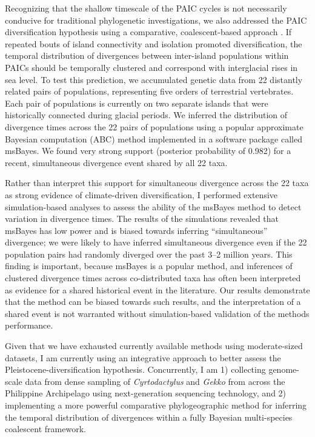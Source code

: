 \documentclass[10pt]{article}
\begin{document}
Recognizing that the shallow timescale of the PAIC cycles is not necessarily conducive for traditional phylogenetic investigations, we also addressed the PAIC diversification hypothesis using a comparative, coalescent-based approach \cite{Oaks2012}.
If repeated bouts of island connectivity and isolation promoted diversification, the temporal distribution of divergences between inter-island populations within PAICs should be temporally clustered and correspond with interglacial rises in sea level.
To test this prediction, we accumulated genetic data from 22 distantly related pairs of populations, representing five orders of terrestrial vertebrates.
Each pair of populations is currently on two separate islands that were historically connected during glacial periods.
We inferred the distribution of divergence times across the 22 pairs of populations using a popular approximate Bayesian computation (ABC) method implemented in a software package called msBayes.
We found very strong support (posterior probability of 0.982) for a recent, simultaneous divergence event shared by all 22 taxa.

Rather than interpret this support for simultaneous divergence across the 22 taxa as strong evidence of climate-driven diversification, I performed extensive simulation-based analyses to assess the ability of the msBayes method to detect variation in divergence times.
The results of the simulations revealed that msBayes has low power and is biased towards inferring ``simultaneous'' divergence; we were likely to have inferred simultaneous divergence even if the 22 population pairs had randomly diverged over the past 3--2 million years.
This finding is important, because msBayes is a popular method, and inferences of clustered divergence times across co-distributed taxa has often been interpreted as evidence for a shared historical event in the literature.
Our results demonstrate that the method can be biased towards such results, and the interpretation of a shared event is not warranted without simulation-based validation of the methods performance.

Given that we have exhausted currently available methods using moderate-sized datasets, I am currently using an integrative approach to better assess the Pleistocene-diversification hypothesis.  Concurrently, I am  1) collecting genome-scale data from dense sampling of \emph{Cyrtodactylus} and \emph{Gekko} from across the Philippine Archipelago using next-generation sequencing technology, and 2) implementing a more powerful comparative phylogeographic method for inferring the temporal distribution of divergences within a fully Bayesian multi-species coalescent framework.
\end{document}
